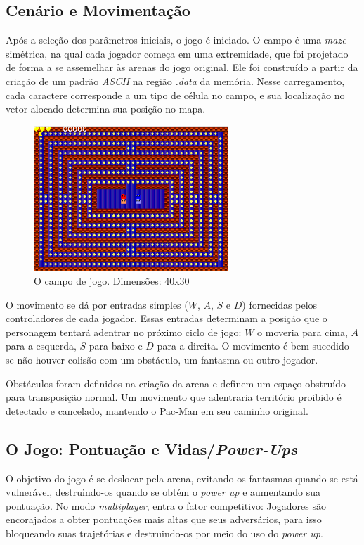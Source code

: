 \documentclass[12pt, a4paper, twocolumn]{article}
\begin{document}
\newpage

\subsection{Cenário e Movimentação}

Após a seleção dos parâmetros iniciais, o jogo é iniciado. O campo é uma \textit{maze} simétrica, na qual cada jogador começa em uma extremidade, que foi projetado de forma a se assemelhar às arenas do jogo original. Ele foi construído a partir da criação de um padrão \textit{ASCII} na região \textit{.data} da memória. Nesse carregamento, cada caractere corresponde a um tipo de célula no campo, e sua localização no vetor alocado determina sua posição no mapa.




\begin{figure}[h!]
    \centering
    \includegraphics[width=0.65\textwidth]{JOGO1.png}
    \caption{O campo de jogo. Dimensões: 40x30}
\end{figure}

O movimento se dá por entradas simples ($W$, $A$, $S$ e $D$) fornecidas pelos controladores de cada jogador. Essas entradas determinam a posição que o personagem tentará adentrar no próximo ciclo de jogo: $W$ o moveria para cima, $A$ para a esquerda, $S$ para baixo e $D$ para a direita. O movimento é bem sucedido se não houver colisão com um obstáculo, um fantasma ou outro jogador.

Obstáculos foram definidos na criação da arena e definem um espaço obstruído para transposição normal. Um movimento que adentraria território proibido é detectado e cancelado, mantendo o Pac-Man em seu caminho original.



\subsection{O Jogo: Pontuação e Vidas/\textit{Power-Ups}}
O objetivo do jogo é se deslocar pela arena, evitando os fantasmas quando se está vulnerável, destruindo-os quando se obtém o \textit{power up} e aumentando sua pontuação. No modo \textit{multiplayer}, entra o fator competitivo: Jogadores são encorajados a obter pontuações mais altas que seus adversários, para isso bloqueando suas trajetórias e destruindo-os por meio do uso do \textit{power up}.
\end{document}
